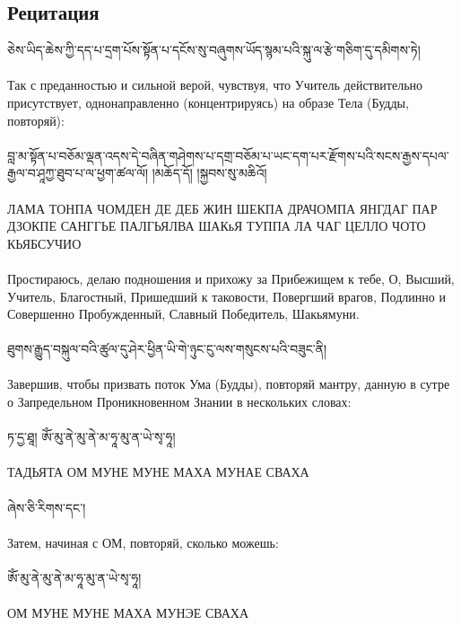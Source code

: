 \subsection{Рецитация}
\scriptsize
\ti
ཅེས་ཡིད་ཆེས་ཀྱི་དད་པ་དྲག་པོས་སྟོན་པ་དངོས་སུ་བཞུགས་ཡོད་སྙམ་པའི་སྐུ་ལ་རྩེ་གཅིག་དུ་དམིགས་ཏེ།\\
\\
\ru
Так с преданностью и сильной верой, чувствуя, что Учитель действительно присутствует,
однонаправленно (концентрируясь) на образе Тела (Будды, повторяй):\\
\\
\normalsize
\ti
བླ་མ་སྟོན་པ་བཅོམ་ལྡན་འདས་དེ་བཞིན་གཤེགས་པ་དགྲ་བཅོམ་པ་ཡང་དག་པར་རྫོགས་པའི་སངས་རྒྱས་དཔལ་རྒྱལ་བ་ཤཱཀྱ་ཐུབ་པ་ལ་ཕྱག་ཚལ་ལོ། 
།མཆོད་དོ། །སྐྱབས་སུ་མཆིའོ། \\
\\
\ru
ЛАМА ТОНПА ЧОМДЕН ДЕ ДЕБ ЖИН ШЕКПА ДРАЧОМПА ЯНГДАГ ПАР ДЗОКПЕ
САНГГЬЕ ПАЛГЬЯЛВА ШАКьЯ ТУППА ЛА ЧАГ ЦЕЛЛО ЧОТО КЬЯБСУЧИО\\
\\
Простираюсь, делаю подношения и прихожу за Прибежищем к тебе, О, Высший, Учитель, Благостный,
Пришедший к таковости, Повергший врагов, Подлинно и Совершенно Пробужденный,
Славный Победитель, Шакьямуни.\\
\\
\scriptsize
\ti
ཐུགས་རྒྱུད་བསྐུལ་བའི་ཚུལ་དུ་ཤེར་ཕྱིན་ཡི་གེ་ཉུང་ངུ་ལས་གསུངས་པའི་བཟུང་ནི།\\
\\
\ru
Завершив, чтобы призвать поток Ума (Будды), повторяй мантру,
данную в сутре о Запредельном Проникновенном Знании в нескольких словах:\\
\\
\normalsize
\ti
ཏ་དྱ་ཐཱ། ཨོཾ་མུ་ནེ་མུ་ནེ་མ་ཧཱ་མུ་ན་ཡེ་སྭ་ཧཱ།\\
\\
\ru
ТАДЬЯТА ОМ МУНЕ МУНЕ МАХА МУНАЕ СВАХА\\
\\
\scriptsize
\ti ཞེས་ཅི་རིགས་དང་།\\
\\
\ru Затем, начиная с ОМ, повторяй, сколько можешь:\\
\\
\normalsize
\ti ཨོཾ་མུ་ནེ་མུ་ནེ་མ་ཧཱ་མུ་ན་ཡེ་སྭ་ཧཱ།\\
\\
\ru  ОМ МУНЕ МУНЕ МАХА МУНЭЕ СВАХА\\
\\
\newpage
